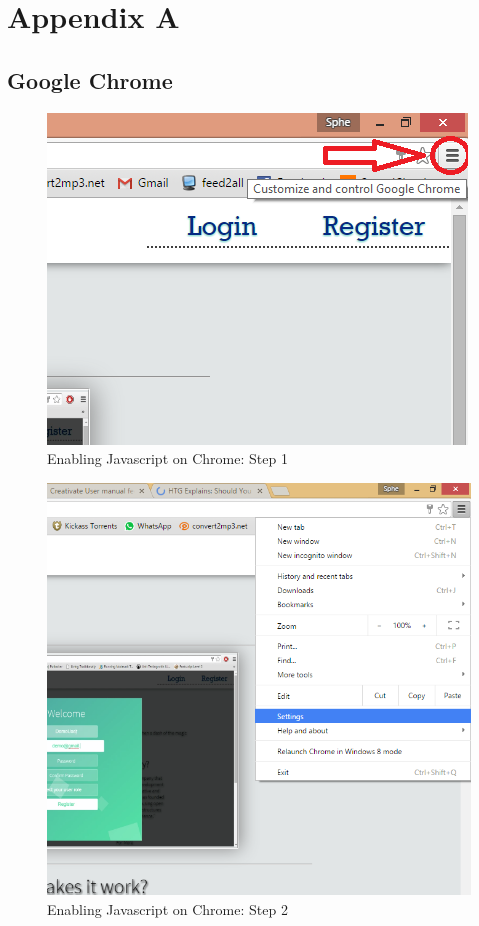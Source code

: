 \section{Appendix A}

\subsection{Google Chrome}
		
		\begin{figure}[!h]
		\centering
			\includegraphics[scale=0.5]{images/javascriptChrome1.png}
			\caption{Enabling Javascript on Chrome: Step 1}
		\end{figure}
		
		\begin{figure}[!h]
		\centering
			\includegraphics[scale=0.5]{images/javascriptChrome2.png}
			\caption{Enabling Javascript on Chrome: Step 2}
		\end{figure}
		
